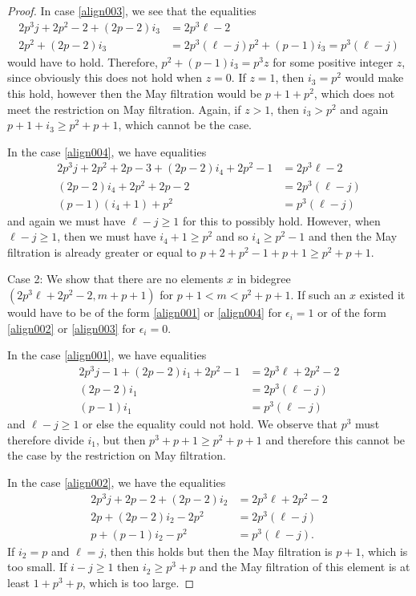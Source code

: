 \begin{proof}
In case \eqref{align003}, we see that the equalities
 \begin{align*}
 2 p^3j+2p^2-2 +(2p-2)i_3& =2p^3\ell-2 \\
  2p^2 +(2p-2)i_3& =2p^3(\ell-j)
  p^2+(p-1)i_3=p^3(\ell-j)
  \end{align*}
  would have to hold. Therefore, $p^2+(p-1)i_3=p^3z$ for some positive integer $z$, since obviously this does not hold when $z=0$. If $z=1$, then $i_3=p^2$ would make this hold, however then the May filtration would be $p+1+p^2$, which does not meet the restriction on May filtration. Again, if $z>1$, then $i_3>p^2$ and again $p+1+i_3\ge p^2+p+1$, which cannot be the case. 
  

In the case \eqref{align004}, we have equalities
\begin{align*}
2p^3j+2p^2+2p-3+(2p-2)i_4+2p^2-1&=2p^3\ell-2  \\
(2p-2)i_4+2p^2+2p-2& = 2p^3(\ell-j) \\
(p-1)(i_4+1)+p^2& =p^3(\ell-j) 
\end{align*}
and again we must have $\ell-j\ge 1$ for this to possibly hold. However, when $\ell-j\ge 1$, then we must have $i_4+1\ge p^2$ and so $i_4\ge p^2-1$ and then the May filtration is already greater or equal to $p+2+p^2-1+p+1\ge p^2+p+1$. 
 
 Case 2: We show that there are no elements  $x$ in bidegree $(2p^3\ell+2p^2-2,m+p+1)$ for $p+1<m<p^2+p+1$. If such an $x$ existed it would have to be of the form  \eqref{align001} or  \eqref{align004} for $\epsilon_i=1$ or  of the form \eqref{align002} or  \eqref{align003} for $\epsilon_i=0$.

 In the case \eqref{align001}, we have equalities
\begin{align*}
2p^3j-1+(2p-2)i_1+2p^2-1&=2p^3\ell+2p^2-2 \\
(2p-2)i_1 & = 2p^3(\ell-j) \\
(p-1)i_1& =p^3(\ell-j) 
\end{align*}
and $\ell-j\ge 1$ or else the equality could not hold. We observe that $p^3$ must therefore divide $i_1$, but then $p^3+p+1\ge p^2+p+1$ and therefore this cannot be the case by the restriction on May filtration. 

 In the case \eqref{align002}, we have the equalities
  \begin{align*}
 2p^3j+2p-2+(2p-2)i_2 & = 2p^3\ell+2p^2-2\\
 2p+(2p-2)i_2-2p^2&=2p^3(\ell-j)\\
 p+(p-1)i_2-p^2&=p^3(\ell-j).
 \end{align*}
 If $i_2=p$ and $\ell=j$, then this holds but then the May filtration is $p+1$, which is too small. If $i-j\ge 1$ then $i_2\ge p^3+p$ and the May filtration of this element is at least $1+p^3+p$, which is too large. 
 

\end{proof}
